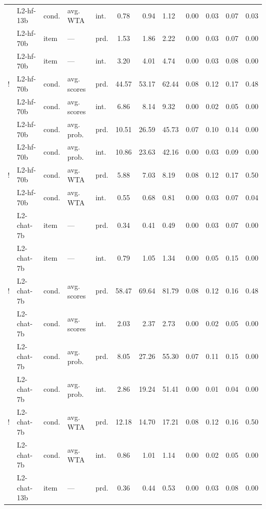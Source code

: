 \documentclass[fleqn]{article}
\begin{document}
\begin{table}[t]
\begin{tabular}{cllllcrlcrlc}
    & L2-hf-13b   & cond. & avg. WTA    & int. & 0.78  & 0.94   & 1.12   & 0.00 & 0.03 & 0.07 & 0.03 \\ \addlinespace[0.5em]
    & L2-hf-70b   & item  & ---         & prd. & 1.53  & 1.86   & 2.22   & 0.00 & 0.03 & 0.07 & 0.00 \\
    & L2-hf-70b   & item  & ---         & int. & 3.20  & 4.01   & 4.74   & 0.00 & 0.03 & 0.08 & 0.00 \\
  ! & L2-hf-70b   & cond. & avg. scores & prd. & 44.57 & 53.17  & 62.44  & 0.08 & 0.12 & 0.17 & 0.48 \\
    & L2-hf-70b   & cond. & avg. scores & int. & 6.86  & 8.14   & 9.32   & 0.00 & 0.02 & 0.05 & 0.00 \\
    & L2-hf-70b   & cond. & avg. prob.  & prd. & 10.51 & 26.59  & 45.73  & 0.07 & 0.10 & 0.14 & 0.00 \\
    & L2-hf-70b   & cond. & avg. prob.  & int. & 10.86 & 23.63  & 42.16  & 0.00 & 0.03 & 0.09 & 0.00 \\
  ! & L2-hf-70b   & cond. & avg. WTA    & prd. & 5.88  & 7.03   & 8.19   & 0.08 & 0.12 & 0.17 & 0.50 \\
    & L2-hf-70b   & cond. & avg. WTA    & int. & 0.55  & 0.68   & 0.81   & 0.00 & 0.03 & 0.07 & 0.04 \\ \addlinespace[0.5em]
    & L2-chat-7b  & item  & ---         & prd. & 0.34  & 0.41   & 0.49   & 0.00 & 0.03 & 0.07 & 0.00 \\
    & L2-chat-7b  & item  & ---         & int. & 0.79  & 1.05   & 1.34   & 0.00 & 0.05 & 0.15 & 0.00 \\
  ! & L2-chat-7b  & cond. & avg. scores & prd. & 58.47 & 69.64  & 81.79  & 0.08 & 0.12 & 0.16 & 0.48 \\
    & L2-chat-7b  & cond. & avg. scores & int. & 2.03  & 2.37   & 2.73   & 0.00 & 0.02 & 0.05 & 0.00 \\
    & L2-chat-7b  & cond. & avg. prob.  & prd. & 8.05  & 27.26  & 55.30  & 0.07 & 0.11 & 0.15 & 0.00 \\
    & L2-chat-7b  & cond. & avg. prob.  & int. & 2.86  & 19.24  & 51.41  & 0.00 & 0.01 & 0.04 & 0.00 \\
  ! & L2-chat-7b  & cond. & avg. WTA    & prd. & 12.18 & 14.70  & 17.21  & 0.08 & 0.12 & 0.16 & 0.50 \\
    & L2-chat-7b  & cond. & avg. WTA    & int. & 0.86  & 1.01   & 1.14   & 0.00 & 0.02 & 0.05 & 0.00 \\ \addlinespace[0.5em]
    & L2-chat-13b & item  & ---         & prd. & 0.36  & 0.44   & 0.53   & 0.00 & 0.03 & 0.08 & 0.00 \\

\end{tabular}
\end{table}
\end{document}
